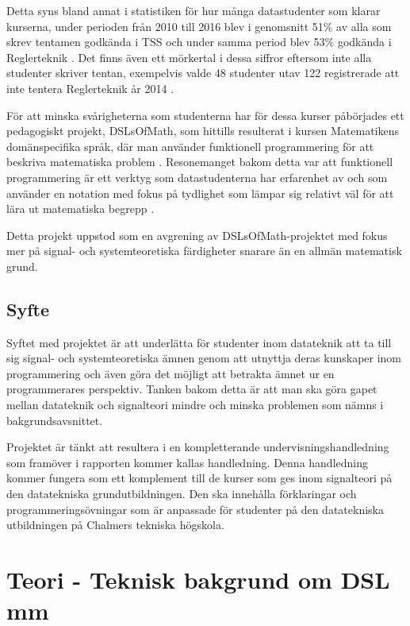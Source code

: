 \documentclass[]{article}
\begin{document}
Detta syns bland annat i statistiken för hur många datastudenter som
klarar kurserna, under perioden från 2010 till 2016 blev i genomsnitt 51\% av
alla som skrev tentamen godkända i TSS och under samma period blev 53\% godkända
i Reglerteknik \cite{tentastatistik}. Det finns även ett mörkertal i dessa siffror
eftersom inte alla studenter skriver tentan, exempelvis valde 48 studenter utav 122
registrerade att inte tentera Reglerteknik år 2014 \cite{kursinformation:ere102:14-15}.

För att minska svårigheterna som studenterna har för dessa kurser påbörjades
ett pedagogiskt projekt, DSLsOfMath, som hittills resulterat i kursen
Matematikens domänspecifika språk, där man använder funktionell
programmering för att beskriva matematiska problem \cite{kursplan:dslsofmath}.
Resonemanget bakom detta var att funktionell programmering är ett verktyg
som datastudenterna har erfarenhet av och som använder en notation med
fokus på tydlighet som lämpar sig relativt väl för att lära ut matematiska
begrepp \cite{TFPIE15_DSLsofMath_IonescuJansson}.

Detta projekt uppstod som en avgrening av DSLsOfMath-projektet med fokus mer på signal- och systemteoretiska färdigheter snarare än en allmän matematisk grund.

\subsection{Syfte}

%

Syftet med projektet är att underlätta för studenter inom datateknik att
ta till sig signal- och systemteoretiska ämnen genom att utnyttja deras
kunskaper inom programmering och även göra det möjligt att betrakta ämnet ur
en programmerares perspektiv. Tanken bakom detta är att man ska göra gapet
mellan datateknik och signalteori mindre och minska problemen som nämns
i bakgrundsavsnittet.

Projektet är tänkt att resultera i en kompletterande undervisningshandledning som
framöver i rapporten kommer kallas handledning.
Denna handledning kommer fungera som ett komplement till de kurser som ges inom
signalteori på den datatekniska grundutbildningen. Den ska innehålla
förklaringar och programmeringsövningar som är anpassade för studenter på den
datatekniska utbildningen på Chalmers tekniska högskola.

\section{Teori - Teknisk bakgrund om DSL mm}
\end{document}
